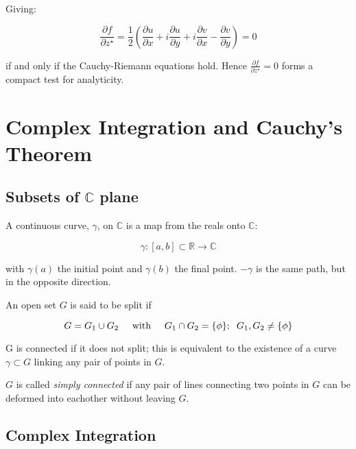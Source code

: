\documentclass{../../physics_notes}
\begin{document}
Giving:

\[ \frac{\partial f}{\partial z^\star} = \frac{1}{2}\left(\frac{\partial u}{\partial x} + i\frac{\partial u}{\partial y} + i\frac{\partial v}{\partial x} - \frac{\partial v}{\partial y}\right) = 0 \]

if and only if the Cauchy-Riemann equations hold. Hence $\frac{\partial f}{\partial z^\star} = 0$ forms a compact test for analyticity. 

\section{Complex Integration and Cauchy's Theorem}

\subsection{Subsets of $\mathbb{C}$ plane}

A continuous curve, $\gamma$, on $\mathbb{C}$ is a map from the reals onto $\mathbb{C}$:

\begin{equation*}
\gamma : \left[a,b\right] \subset \mathbb{R} \longrightarrow \mathbb{C}
\end{equation*}

with $\gamma (a)$ the initial point and $\gamma (b)$ the final point. $-\gamma$ is the same path, but in the opposite direction.

An open set $G$ is said to be split if 

\begin{equation*}
G = G_1 \cup G_2 \hspace{.5cm} \text{with} \hspace{.5cm} G_1 \cap G_2 = \{\phi\}; \hspace{.2cm} G_1 , G_2 \neq \{\phi\}
\end{equation*}

G is connected if it does not split; this is equivalent to the existence of a curve $\gamma \subset G$ linking any pair of points in $G$.

$G$ is called \emph{simply connected} if any pair of lines connecting two points in $G$ can be deformed into eachother without leaving $G$.

\subsection{Complex Integration }
\end{document}
